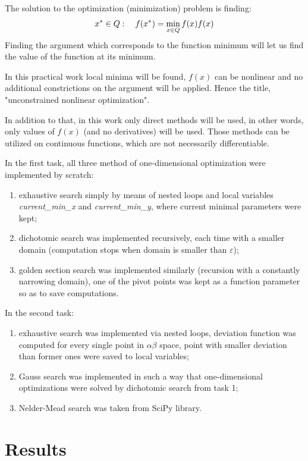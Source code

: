 \documentclass[12pt, a4paper]{article}
\begin{document}
The solution to the optimization (minimization) problem is finding:
\[ x^* \in Q: \quad f(x^*) = \min_{x\in Q} f(x) \def \arg \min_{x\in Q} f(x) \]
Finding the argument which corresponds to the function minimum will let us find the value of the function at its minimum.

In this practical work local minima will be found, $f(x)$ can be nonlinear and no additional constrictions on the argument will be applied. Hence the title, "unconstrained nonlinear optimization".

In addition to that, in this work only direct methods will be used, in other words, only values of $f(x)$ (and no derivatives) will be used. Those methods can be utilized on continuous functions, which are not necessarily differentiable.

In the first task, all three method of one-dimensional optimization were implemented by scratch: 
\begin{enumerate}
	\item exhaustive search simply by means of nested loops and local variables \textit{current\_min\_x} and \textit{current\_min\_y}, where current minimal parameters were kept;
	\item dichotomic search was implemented recursively, each time with a smaller domain (computation stops when domain is smaller than $\varepsilon$);
	\item golden section search was implemented similarly (recursion with a constantly narrowing domain), one of the pivot points was kept as a function parameter so as to save computations.
\end{enumerate}

In the second task:
\begin{enumerate}
	\item exhaustive search was implemented via nested loops, deviation function was computed for every single point in $\alpha \beta$ space, point with smaller deviation than former ones were saved to local variables;
	\item Gauss search was implemented in such a way that one-dimensional optimizations were solved by dichotomic search from task 1;
	\item Nelder-Mead search was taken from SciPy library.
\end{enumerate}

\newpage

\section*{Results}
\end{document}
